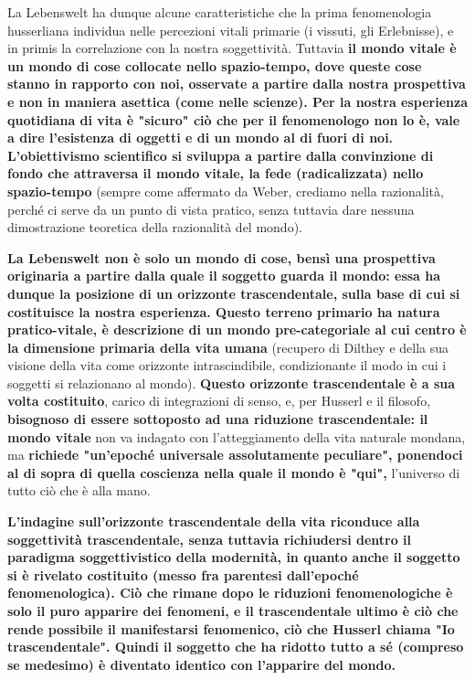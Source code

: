 La Lebenswelt ha dunque alcune caratteristiche che
la prima fenomenologia husserliana individua nelle percezioni
vitali primarie (i vissuti, gli Erlebnisse), e in primis
la correlazione con la nostra soggettività. Tuttavia
\textbf{il mondo vitale è un mondo di cose collocate
nello spazio-tempo, dove queste cose stanno in
rapporto con noi, osservate a partire dalla nostra
prospettiva e non in maniera asettica (come nelle
scienze).
Per la nostra esperienza quotidiana di vita è
"sicuro" ciò che per il fenomenologo non lo è, vale
a dire l'esistenza di oggetti e di un mondo
al di fuori di noi. L'obiettivismo scientifico
si sviluppa a partire dalla convinzione di fondo
che attraversa il mondo vitale, la fede (radicalizzata) nello
spazio-tempo} (sempre come affermato da Weber, crediamo nella razionalità,  perché ci serve da un punto di vista pratico, senza tuttavia dare nessuna dimostrazione teoretica della razionalità del mondo).

 \textbf{La Lebenswelt non è solo un mondo
di cose, bensì una prospettiva originaria a partire
dalla quale il soggetto guarda il mondo: essa
ha dunque la posizione di un orizzonte trascendentale,
sulla base di cui si costituisce la nostra esperienza.
Questo terreno primario ha natura pratico-vitale,
è descrizione di un mondo pre-categoriale al cui
centro è la dimensione primaria della vita umana}
(recupero di Dilthey e della sua visione della vita
come orizzonte intrascindibile, condizionante il
modo in cui i soggetti si relazionano al mondo).
\textbf{Questo orizzonte trascendentale è a sua volta
costituito}, carico di integrazioni di senso, e,
per Husserl e il filosofo, \textbf{bisognoso di essere sottoposto ad
una riduzione trascendentale: il mondo vitale}
non va indagato con l'atteggiamento della vita
naturale mondana, ma \textbf{richiede "un'epoché universale
assolutamente peculiare", ponendoci al di sopra di
quella coscienza nella quale il mondo è "qui",}
l'universo di tutto ciò che è alla mano.

\textbf{L'indagine sull'orizzonte trascendentale della
vita riconduce alla soggettività trascendentale,
senza tuttavia richiudersi dentro il
paradigma soggettivistico della modernità, in
quanto anche il soggetto si è rivelato costituito
(messo fra parentesi dall'epoché fenomenologica).
Ciò che rimane dopo le riduzioni fenomenologiche è
solo il puro apparire dei fenomeni, e il trascendentale
ultimo è ciò che rende possibile il manifestarsi
fenomenico, ciò che Husserl chiama "Io
trascendentale". Quindi il soggetto che ha ridotto
tutto a sé (compreso se medesimo) è diventato
identico con l'apparire del mondo.}

